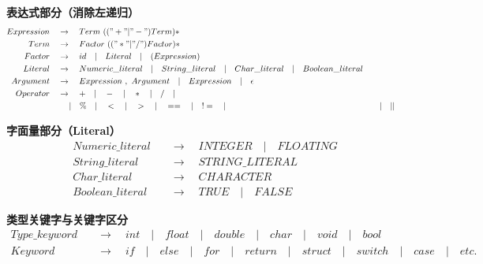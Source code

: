 \documentclass[11pt]{article}
\begin{document}
    \textbf{表达式部分（消除左递归）}
    \begin{align*}
    Expression &\quad \to \quad Term\ (("+" | "-") Term)* \\
    Term &\quad \to \quad Factor\ (("*" | "/") Factor)* \\
    Factor &\quad \to \quad id \quad |\quad Literal \quad |\quad ( Expression ) \\
    Literal &\quad \to \quad Numeric\_literal \quad |\quad String\_literal \quad |\quad Char\_literal \quad |\quad Boolean\_literal \\
    Argument &\quad \to \quad Expression\ ,\ Argument \quad |\quad Expression \quad |\quad \epsilon \\
    Operator &\quad \to \quad + \quad |\quad - \quad |\quad * \quad |\quad / \quad |\quad \\&\quad \quad \ |\quad\% \quad |\quad < \quad |\quad > \quad |\quad == \quad |\quad != \quad |\quad && \quad |\quad || \\
    \end{align*}
    
    \textbf{字面量部分（Literal）}
    \begin{align*}
    Numeric\_literal &\quad \to \quad INTEGER \quad |\quad FLOATING \\
    String\_literal &\quad \to \quad STRING\_LITERAL \\
    Char\_literal &\quad \to \quad CHARACTER \\
    Boolean\_literal &\quad \to \quad TRUE \quad |\quad FALSE
    \end{align*}

    \textbf{类型关键字与关键字区分}
    \begin{align*}
    Type\_keyword &\quad \to \quad int \quad |\quad float \quad |\quad double \quad |\quad char \quad |\quad void \quad |\quad bool \\
    Keyword &\quad \to \quad if \quad |\quad else \quad |\quad for \quad |\quad return \quad |\quad struct \quad |\quad switch \quad |\quad case \quad |\quad etc.
    \end{align*}
\end{document}
